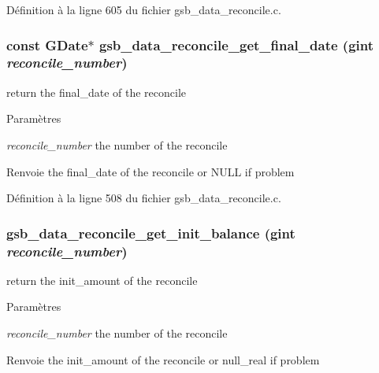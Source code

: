 Définition à la ligne 605 du fichier gsb\_\-data\_\-reconcile.c.

\subsubsection[{gsb\_\-data\_\-reconcile\_\-get\_\-final\_\-date}]{\setlength{\rightskip}{0pt plus 5cm}const GDate$\ast$ gsb\_\-data\_\-reconcile\_\-get\_\-final\_\-date (gint {\em reconcile\_\-number})}\label{gsb__data__reconcile_8c_ac2e105ad149161a371283aa75049d3b6}
return the final\_\-date of the reconcile


\begin{DoxyParams}{Paramètres}
\item[{\em reconcile\_\-number}]the number of the reconcile\end{DoxyParams}
\begin{DoxyReturn}{Renvoie}
the final\_\-date of the reconcile or NULL if problem 
\end{DoxyReturn}


Définition à la ligne 508 du fichier gsb\_\-data\_\-reconcile.c.

\subsubsection[{gsb\_\-data\_\-reconcile\_\-get\_\-init\_\-balance}]{ gsb\_\-data\_\-reconcile\_\-get\_\-init\_\-balance (gint {\em reconcile\_\-number})}\label{gsb__data__reconcile_8c_ac14e8641bb156f533d7ac2427c4b9cfc}
return the init\_\-amount of the reconcile


\begin{DoxyParams}{Paramètres}
\item[{\em reconcile\_\-number}]the number of the reconcile\end{DoxyParams}
\begin{DoxyReturn}{Renvoie}
the init\_\-amount of the reconcile or null\_\-real if problem 
\end{DoxyReturn}


